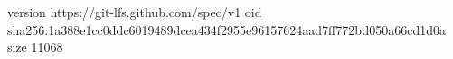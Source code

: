version https://git-lfs.github.com/spec/v1
oid sha256:1a388e1cc0ddc6019489dcea434f2955e96157624aad7ff772bd050a66cd1d0a
size 11068
